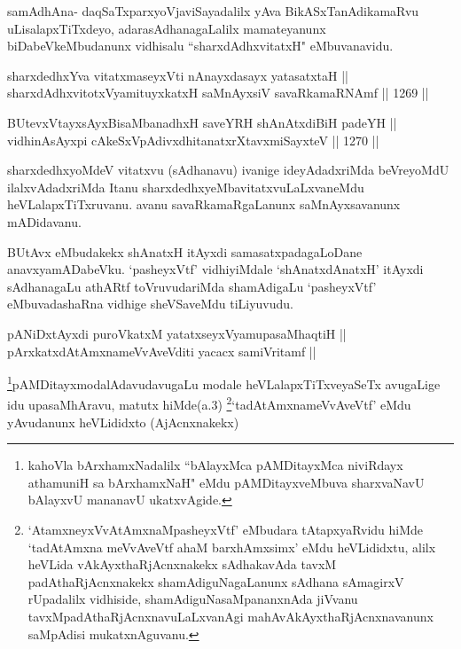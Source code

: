 \begin{artha}
samAdhAna- daqSaTxparxyoVjaviSayadalilx yAva BikASxTanAdikamaRvu uLisalapxTiTxdeyo, adarasAdhanagaLalilx mamateyanunx biDabeVkeMbudanunx vidhisalu ``sharxdAdhxvitatxH" eMbuvanavidu.
\end{artha}

\begin{shl}
sharxdedhxYva vitatxmaseyxVti nAnayxdasayx yatasatxtaH || \\
sharxdAdhxvitotxV\s yamituyxkatxH saMnAyxsiV savaRkamaRNAmf \hfill || 1269 ||  
\end{shl}
				
\begin{shl}
BUtevxVtayxsAyxBisaMbanadhxH saveYRH shAnAtxdiBiH padeYH || \\
vidhinA\s sAyxpi cA\s \s keSxVpAdivxdhitanatxrXtavxmiSayxteV \hfill || 1270 ||  
\end{shl}

\begin{artha}
sharxdedhxyoMdeV vitatxvu (sAdhanavu) ivanige ideyAdadxriMda beVreyoMdU ilalxvAdadxriMda Itanu sharxdedhxyeMbavitatxvuLaLxvaneMdu heVLalapxTiTxruvanu. avanu savaRkamaRgaLanunx saMnAyxsavanunx mADidavanu.
\end{artha}

\begin{artha}
BUtAvx eMbudakekx shAnatxH itAyxdi samasatxpadagaLoDane anavxyamADabeVku. `pasheyxVtf' vidhiyiMdale `shAnatxdAnatxH' itAyxdi sAdhanagaLu athARtf toVruvudariMda shamAdigaLu `pasheyxVtf' eMbuvadashaRna vidhige sheVSaveMdu tiLiyuvudu.
\end{artha}


\begin{shl}
pANiDxtAyxdi puroVkatxM yatatxseyxVyamupasaMhaqtiH || \\
pArxkatxdAtAmxnameVvAveVditi yacacx samiVritamf ||
\end{shl}

\begin{artha}
\footnote{kahoVla bArxhamxNadalilx ``bAlayxMca pAMDitayxMca niviRdayx athamuniH sa bArxhamxNaH" eMdu pAMDitayxveMbuva sharxvaNavU bAlayxvU mananavU ukatxvAgide.}pAMDitayxmodalAdavudavugaLu modale heVLalapxTiTxveyaSeTx avugaLige idu upasaMhAravu, matutx hiMde(a.3) \footnote{`AtamxneyxVvA\s \s tAmxnaMpasheyxVtf' eMbudara tAtapxyaRvidu hiMde `tadAtAmxna meVvAveVtf ahaM barxhAmxsimx' eMdu heVLididxtu, alilx heVLida vAkAyxthaRjAcnxnakekx sAdhakavAda tavxM padAthaRjAcnxnakekx shamAdiguNagaLanunx sAdhana sAmagirxV rUpadalilx vidhiside, shamAdiguNasaMpananxnAda jiVvanu tavxMpadAthaRjAcnxnavuLaLxvanAgi mahAvAkAyxthaRjAcnxnavanunx saMpAdisi mukatxnAguvanu.}`tadAtAmxnameVvAveVtf' eMdu yAvudanunx heVLididxto (AjAcnxnakekx)
\end{artha}

